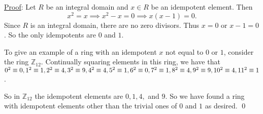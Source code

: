 \documentclass{article}
\begin{document}
\underline{Proof}: Let $R$ be an integral domain and $x \in R$ be an idempotent element. Then 
$$ x^2 = x \implies x^2 - x = 0 \implies x(x-1) = 0.$$
Since $R$ is an integral domain, there are no zero divisors. Thus $x = 0$ or $x-1 = 0$. So the only idempotents are $0$ and $1$. 

To give an example of a ring with an idempotent $x$ not equal to $0$ or $1$, consider the ring $\mathbb{Z}_{12}$. Continually squaring elements in this ring, we have that $0^2 \equiv 0, 1^2 \equiv 1, 2^2 \equiv 4, 3^2 \equiv 9, 4^2 \equiv 4, 5^2 \equiv 1, 6^2 \equiv 0, 7^2 \equiv 1, \linebreak 8^2 \equiv 4, 9^2 \equiv 9, 10^2 \equiv 4, 11^2 \equiv 1$.

So in $\mathbb{Z}_{12}$ the idempotent elements are $0, 1, 4,$ and $9$. So we have found a ring with idempotent elements other than the trivial ones of $0$ and $1$ as desired. \qed \\
\end{document}

